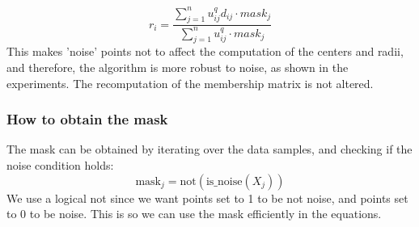 \documentclass[conference]{IEEEtran}
\begin{document}
\begin{equation}\label{eq:r_i_new}
    r_i = \frac{\sum_{j=1}^{n} u_{ij}^q d_{ij} \cdot mask_j}{\sum_{j=1}^{n} u_{ij}^q \cdot mask_j}
\end{equation}
This makes 'noise' points not to affect the computation of the centers and radii, and therefore, the algorithm is more robust to noise, as shown in the experiments.
The recomputation of the membership matrix is not altered.

\subsubsection{How to obtain the mask}
The mask can be obtained by iterating over the data samples, and checking if the noise condition holds:
\begin{equation}
    \text{mask}_j = \text{not}(\text{is\_noise}(X_j))
\end{equation}
We use a logical not since we want points set to 1 to be not noise, and points set to 0 to be noise. This is so we can use the mask efficiently in the equations.
\end{document}
